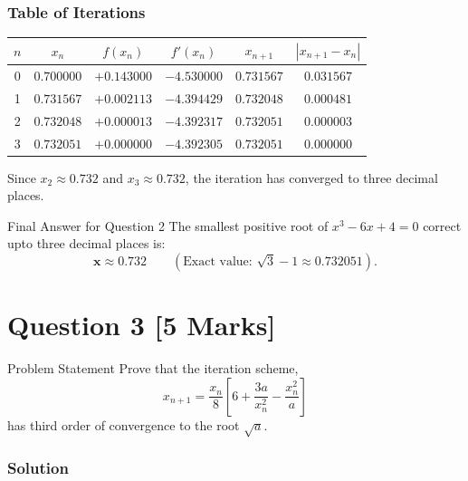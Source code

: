 \documentclass[11pt,a4paper]{article}
\begin{document}
\subsubsection*{Table of Iterations}
\begin{center}
\begin{tabular}{cccccc}
\toprule
$n$ & $x_n$ & $f(x_n)$ & $f'(x_n)$ & $x_{n+1}$ & $|x_{n+1} - x_n|$ \\
\midrule
0 & $0.700000$ & $+0.143000$ & $-4.530000$ & $0.731567$ & $0.031567$ \\
1 & $0.731567$ & $+0.002113$ & $-4.394429$ & $0.732048$ & $0.000481$ \\
2 & $0.732048$ & $+0.000013$ & $-4.392317$ & $0.732051$ & $0.000003$ \\
3 & $0.732051$ & $+0.000000$ & $-4.392305$ & $0.732051$ & $0.000000$ \\
\bottomrule
\end{tabular}
\end{center}

\noindent Since $x_2 \approx 0.732$ and $x_3 \approx 0.732$, the iteration has converged to three decimal places.

\begin{answerbox}{Final Answer for Question 2}
The smallest positive root of $x^3 - 6x + 4 = 0$ correct upto three decimal places is:
\[
\mathbf{x \approx 0.732} \qquad (\text{Exact value: } \sqrt{3} - 1 \approx 0.732051).
\]
\end{answerbox}

\vspace{0.8cm}

\section*{Question 3 \hfill \normalsize [5 Marks]}

\begin{questionbox}{Problem Statement}
Prove that the iteration scheme,
\[
x_{n+1} = \frac{x_n}{8}\left[6 + \frac{3a}{x_n^2} - \frac{x_n^2}{a}\right]
\]
has third order of convergence to the root $\sqrt{a}$.
\end{questionbox}

\subsubsection*{Solution}
\end{document}
